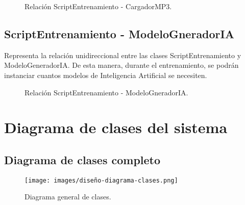 \begin{figure}[H]
  \centering
  
  \caption{Relación ScriptEntrenamiento - CargadorMP3.}
\end{figure}

\subsection{ScriptEntrenamiento - ModeloGneradorIA}

Representa la relación unidireccional entre las clases ScriptEntrenamiento y ModeloGeneradorIA. De esta manera, durante el entrenamiento, se podrán instanciar cuantos modelos de Inteligencia Artificial se necesiten.

\begin{figure}[H]
  \centering
  
  \caption{Relación ScriptEntrenamiento - ModeloGneradorIA.}
\end{figure}

\section{Diagrama de clases del sistema}

\subsection{Diagrama de clases completo}

\begin{figure}[H]
  \centering
  \texttt{[image: images/diseño-diagrama-clases.png]}
  \caption{Diagrama general de clases.}
\end{figure}
